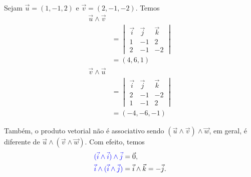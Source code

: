 \begin{ex}
  Sejam $\vec{u}=(1,-1,2)$ e $\vec{v}=(2,-1,-2)$. Temos
  \begin{align}
    \vec{u}\land\vec{v} \\
    &= \begin{vmatrix}
      \vec{i} & \vec{j} & \vec{k} \\
      1 & -1 & 2 \\
      2 & -1 & -2                                    
    \end{vmatrix} \\
    &= (4,6,1)
  \end{align}
  \begin{align}
    \vec{v}\land\vec{u} \\
    &= \begin{vmatrix}
      \vec{i} & \vec{j} & \vec{k} \\
      2 & -1 & -2 \\
      1 & -1 & 2
    \end{vmatrix} \\
    &= (-4,-6,-1)
  \end{align}
\end{ex}

Também, o {\color{blue}produto vetorial não é associativo} sendo $(\vec{u}\land\vec{v})\land\vec{w}$, em geral, é diferente de $\vec{u}\land(\vec{v}\land\vec{w})$. Com efeito, temos
\begin{align}
  {\color{blue}(\vec{i}\land\vec{i})\land\vec{j}} &= \vec{0},\\
  {\color{blue}\vec{i}\land(\vec{i}\land\vec{j})} &= \vec{i}\land\vec{k} = -\vec{j}.
\end{align}

